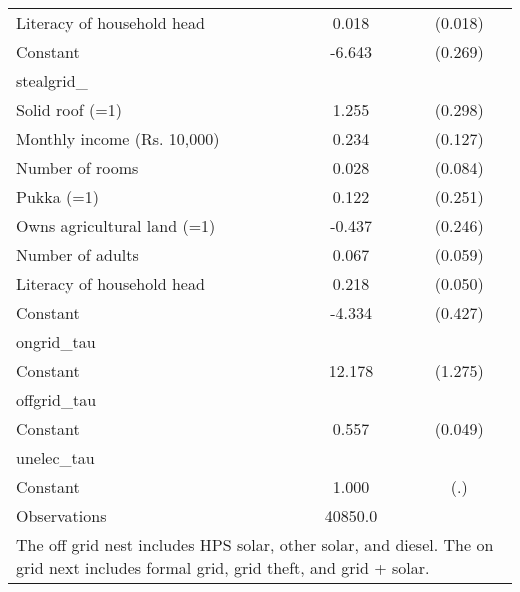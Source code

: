 \begin{table}[htbp]
\begin{tabular}{l*{1}{cc}}
Literacy of household head&       0.018         &     (0.018)\\
Constant            &      -6.643\sym{***}&     (0.269)\\
\midrule
stealgrid\_          &                     &            \\
Solid roof (=1)     &       1.255\sym{***}&     (0.298)\\
Monthly income (Rs. 10,000)&       0.234\sym{*}  &     (0.127)\\
Number of rooms     &       0.028         &     (0.084)\\
Pukka (=1)          &       0.122         &     (0.251)\\
Owns agricultural land (=1)&      -0.437\sym{*}  &     (0.246)\\
Number of adults    &       0.067         &     (0.059)\\
Literacy of household head&       0.218\sym{***}&     (0.050)\\
Constant            &      -4.334\sym{***}&     (0.427)\\
\midrule
ongrid\_tau          &                     &            \\
Constant            &      12.178\sym{***}&     (1.275)\\
\midrule
offgrid\_tau         &                     &            \\
Constant            &       0.557\sym{***}&     (0.049)\\
\midrule
unelec\_tau          &                     &            \\
Constant            &       1.000         &         (.)\\
\midrule
Observations        &     40850.0         &            \\
\bottomrule
\multicolumn{3}{l}{\footnotesize The off grid nest includes HPS solar, other solar, and diesel.                 The on grid next includes formal grid, grid theft, and grid + solar.}\\
\end{tabular}
\end{table}
